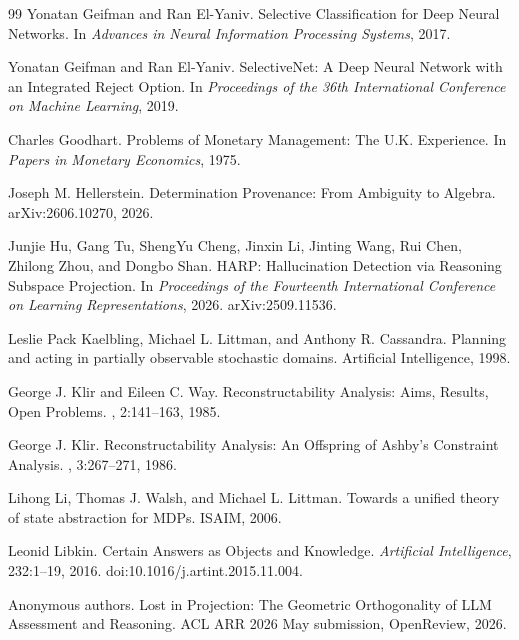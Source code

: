 \documentclass[11pt]{article}
\theoremstyle{definition}
\theoremstyle{remark}
\begin{document}
\begin{thebibliography}{99}
Yonatan Geifman and Ran El-Yaniv.
\newblock Selective Classification for Deep Neural Networks.
\newblock In \emph{Advances in Neural Information Processing Systems}, 2017.

Yonatan Geifman and Ran El-Yaniv.
\newblock SelectiveNet: A Deep Neural Network with an Integrated Reject Option.
\newblock In \emph{Proceedings of the 36th International Conference on Machine Learning}, 2019.

Charles Goodhart.
\newblock Problems of Monetary Management: The U.K. Experience.
\newblock In \emph{Papers in Monetary Economics}, 1975.

Joseph M. Hellerstein.
\newblock Determination Provenance: From Ambiguity to Algebra.
\newblock arXiv:2606.10270, 2026.

Junjie Hu, Gang Tu, ShengYu Cheng, Jinxin Li, Jinting Wang, Rui Chen, Zhilong Zhou, and Dongbo Shan.
\newblock HARP: Hallucination Detection via Reasoning Subspace Projection.
\newblock In \emph{Proceedings of the Fourteenth International Conference on Learning Representations}, 2026.
\newblock arXiv:2509.11536.

Leslie Pack Kaelbling, Michael L. Littman, and Anthony R. Cassandra.
\newblock Planning and acting in partially observable stochastic domains.
\newblock Artificial Intelligence, 1998.

George J. Klir and Eileen C. Way.
\newblock Reconstructability Analysis: Aims, Results, Open Problems.
, 2:141--163, 1985.

George J. Klir.
\newblock Reconstructability Analysis: An Offspring of Ashby's Constraint Analysis.
, 3:267--271, 1986.

Lihong Li, Thomas J. Walsh, and Michael L. Littman.
\newblock Towards a unified theory of state abstraction for MDPs.
\newblock ISAIM, 2006.

Leonid Libkin.
\newblock Certain Answers as Objects and Knowledge.
\newblock \emph{Artificial Intelligence}, 232:1--19, 2016.
\newblock doi:10.1016/j.artint.2015.11.004.

Anonymous authors.
\newblock Lost in Projection: The Geometric Orthogonality of LLM Assessment and Reasoning.
\newblock ACL ARR 2026 May submission, OpenReview, 2026.


\end{thebibliography}
\end{document}
